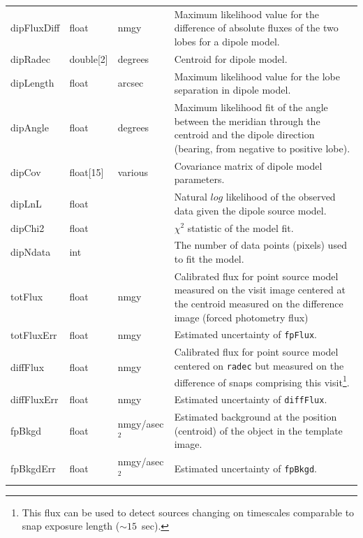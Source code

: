 \documentclass[12pt]{article}
\begin{document}
\begin{center}
\begin{longtable}{p{3cm}p{2cm}p{2cm}p{5cm}}
dipFluxDiff & float & nmgy & Maximum likelihood value for the difference of absolute fluxes of the two lobes for a dipole model.
\\

dipRadec & double[2] & degrees & Centroid for dipole model. \\

dipLength & float & arcsec & Maximum likelihood value for the lobe separation in dipole model. \\

dipAngle & float & degrees & Maximum likelihood fit of the angle between the meridian through the centroid and the dipole direction (bearing, from negative to positive lobe). \\

dipCov & float[15] & various & Covariance matrix of dipole model parameters. \\

dipLnL & float & ~ & Natural $log$ likelihood of the observed data given the dipole source model. \\

dipChi2 & float & ~ & $\chi^2$ statistic of the model fit. \\

dipNdata & int & ~ & The number of data points (pixels) used to fit the model. \\

totFlux & float & nmgy & Calibrated flux for point source model measured on the visit image centered at the centroid measured on the difference image (forced photometry flux) \\

totFluxErr & float & nmgy & Estimated uncertainty of \texttt{fpFlux}. \\

diffFlux & float & nmgy & Calibrated flux for point source model centered on {\tt radec} but measured on the difference of snaps comprising this visit\footnote{This flux can be used to detect sources changing on timescales comparable to snap exposure length ($\sim 15$~sec).}. \\

diffFluxErr & float & nmgy & Estimated uncertainty of \texttt{diffFlux}. \\

fpBkgd & float & nmgy/asec$^{2}$ & Estimated background at the position (centroid) of the object in
the template image. \\

fpBkgdErr & float & nmgy/asec$^{2}$ & Estimated uncertainty of \texttt{fpBkgd}. \\


\end{longtable}
\end{center}
\end{document}
